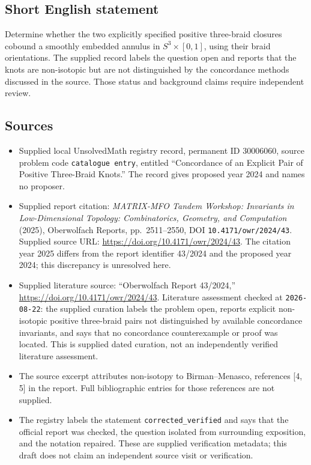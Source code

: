 \documentclass[11pt]{article}
\begin{document}
\subsection{Short English statement}
Determine whether the two explicitly specified positive three-braid closures cobound a smoothly embedded annulus in \(S^3\times[0,1]\), using their braid orientations. The supplied record labels the question open and reports that the knots are non-isotopic but are not distinguished by the concordance methods discussed in the source. Those status and background claims require independent review.
\subsection{Sources}
\begin{itemize}
\item Supplied local UnsolvedMath registry record, permanent ID \(30006060\), source problem code \texttt{catalogue entry}, entitled ``Concordance of an Explicit Pair of Positive Three-Braid Knots.'' The record gives proposed year 2024 and names no proposer.
\item Supplied report citation: \emph{MATRIX-MFO Tandem Workshop: Invariants in Low-Dimensional Topology: Combinatorics, Geometry, and Computation} (2025), Oberwolfach Reports, pp.\ 2511--2550, DOI \texttt{10.4171/owr/2024/43}. Supplied source URL: \url{https://doi.org/10.4171/owr/2024/43}. The citation year 2025 differs from the report identifier 43/2024 and the proposed year 2024; this discrepancy is unresolved here.
\item Supplied literature source: ``Oberwolfach Report 43/2024,'' \url{https://doi.org/10.4171/owr/2024/43}. Literature assessment checked at \texttt{2026-08-22}: the supplied curation labels the problem open, reports explicit non-isotopic positive three-braid pairs not distinguished by available concordance invariants, and says that no concordance counterexample or proof was located. This is supplied dated curation, not an independently verified literature assessment.
\item The source excerpt attributes non-isotopy to Birman--Menasco, references [4, 5] in the report. Full bibliographic entries for those references are not supplied.
\item The registry labels the statement \texttt{corrected\_verified} and says that the official report was checked, the question isolated from surrounding exposition, and the notation repaired. These are supplied verification metadata; this draft does not claim an independent source visit or verification.
\end{itemize}
\end{document}
